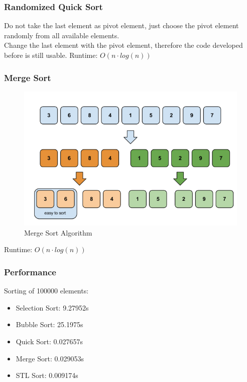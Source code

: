 \begin{frame}[fragile]
\frametitle{Randomized Quick Sort}
Do not take the last element as pivot element, just choose
the pivot element randomly from all available elements.\\
Change the last element with the pivot element, therefore
the code developed before is still usable.
Runtime: $O(n \cdot log(n))$
\end{frame}

\begin{frame}[fragile]
\frametitle{Merge Sort}
\begin{figure}[h]
\centering\includegraphics[scale=0.3]{img/mergesort_new.png}
\caption{Merge Sort Algorithm}
\end{figure}
Runtime: $O(n \cdot log(n))$
\end{frame}

\begin{frame}[fragile]
\frametitle{Performance}
Sorting of 100000 elements:
\begin{itemize}
\item Selection Sort: 9.27952s
\item Bubble Sort: 25.1975s
\item Quick Sort: 0.027657s
\item Merge Sort: 0.029053s
\item STL Sort: 0.009174s
\end{itemize}
\end{frame}

